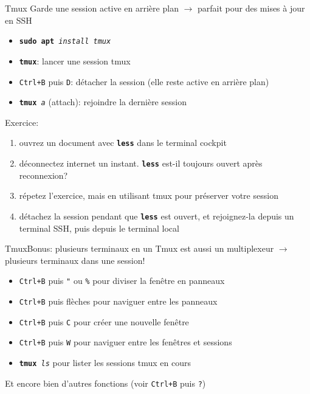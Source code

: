 \documentclass[
aspectratio=169 %
]{beamer}
\newcommand{\cmd}[1]{\texttt{\textbf{#1}}}
\newcommand{\args}[1]{\texttt{\textit{#1}}}
\begin{document}
\begin{frame}{Tmux}
    Garde une session active en arrière plan \(\rightarrow\)
    \alert{parfait pour des mises à jour en SSH}
    \begin{itemize}
        \item \cmd{sudo apt}\args{ install tmux}
        \item \cmd{tmux}: lancer une session tmux
        \item \texttt{Ctrl+B} puis \texttt{D}: détacher la session (elle
              reste active en arrière plan)
        \item \cmd{tmux}\args{ a} (attach): rejoindre la dernière session
    \end{itemize}

    \bigskip
    Exercice:
    \begin{enumerate}
        \item ouvrez un document avec \cmd{less} dans le terminal cockpit
        \item déconnectez internet un instant. \cmd{less} est-il toujours
              ouvert après reconnexion?
        \item répetez l'exercice, mais en utilisant tmux pour préserver votre
              session
        \item détachez la session pendant que \cmd{less} est ouvert, et
              rejoignez-la depuis un terminal SSH, puis depuis le terminal local
    \end{enumerate}
\end{frame}

\begin{frame}{Tmux}{Bonus: plusieurs terminaux en un}
    Tmux est aussi un multiplexeur \(\rightarrow\) plusieurs terminaux dans une
    session!
    \medskip

    \begin{itemize}
        \item \texttt{Ctrl+B} puis \texttt{"} ou \texttt{\%} pour diviser la
              fenêtre en panneaux
        \item \texttt{Ctrl+B} puis flèches pour naviguer entre les
              panneaux
        \item \texttt{Ctrl+B} puis \texttt{C} pour créer une nouvelle fenêtre
        \item \texttt{Ctrl+B} puis \texttt{W} pour naviguer entre les fenêtres
              et
              sessions
        \item \cmd{tmux}\args{ ls} pour lister les sessions tmux en cours
    \end{itemize}

    \bigskip
    Et encore bien d'autres fonctions (voir \texttt{Ctrl+B} puis \texttt{?})

\end{frame}
\end{document}
